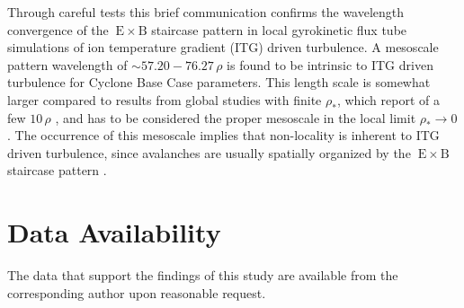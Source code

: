 \documentclass[aip, amsmath, amssymb, reprint, twocolumn, floatfix]{revtex4-1}
\newcommand{\exb}{\mathrm{\:E}\times\mathrm{B}}
\newcommand{\rhoth}{\rho}
\begin{document}


Through careful tests this brief communication confirms the wavelength convergence of the $\exb$ staircase pattern in local gyrokinetic flux tube simulations of ion temperature gradient (ITG) driven turbulence.
A mesoscale pattern wavelength of $\sim 57.20 - 76.27\,\rhoth$ is found to be intrinsic to ITG driven turbulence for Cyclone Base Case parameters.
This length scale is somewhat larger compared to results from global studies with finite $\rho_\ast$, which report of a few $10\,\rhoth$ \cite{pradalier2010}, and has to be considered the proper mesoscale in the local limit $\rho_\ast \rightarrow 0$.  
The occurrence of this mesoscale implies that non-locality is inherent to ITG driven turbulence, since avalanches are usually spatially organized by the $\exb$ staircase pattern \cite{mcmillan2009, pradalier2010, rath2016, peeters2016}. 


\section*{Data Availability}
The data that support the findings of this study are available from the corresponding author upon reasonable request. 




\nocite{}
\end{document}
